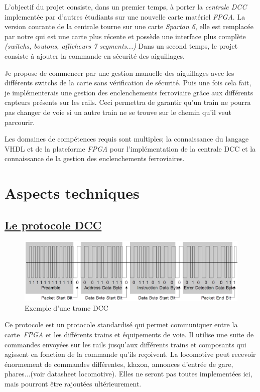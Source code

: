 L'objectif du projet consiste, dans un premier temps, à porter la
\emph{centrale DCC} implement\'ee par d'autres \'etudiants sur une nouvelle
carte mat\'eriel \emph{FPGA}. La version courante de la centrale tourne sur
une carte \emph{Spartan 6}, elle est remplac\'ee par notre \crt qui est
une carte plus r\'ecente et possède une interface plus complète
\emph{(switchs, boutons, afficheurs 7 segments...)}
Dans un second temps, le projet consiste à ajouter la commande en
sécurité des aiguillages.

Je propose de commencer par une gestion manuelle des aiguillages avec
les diff\'erents switchs de la carte sans v\'erification de
s\'ecurit\'e.
Puis une fois cela fait, je impl\'ementerais une gestion des
enclenchements ferroviaire grâce aux différents capteurs pr\'esents sur
les rails. Ceci permettra de garantir qu'un train ne pourra pas
changer de voie si un autre train ne se trouve sur le chemin
qu'il veut parcourir. 

Les domaines de comp\'etences requis sont multiples; la connaissance
du langage VHDL et de la plateforme \emph{FPGA} pour l'impl\'ementation
de la centrale DCC et la connaissance de la gestion des enclenchements
ferroviaires.


\newpage
\section{Aspects techniques}
\label{sec:asp_tech}

\subsection{\underline{Le protocole DCC}}
\label{sec:dcc}


\begin{figure}[h]
\centering
\includegraphics[scale=0.75]{trame.png}
\caption{Exemple d'une trame DCC}
\label{fig1}
\end{figure}

Ce protocole est un protocole standardis\'e qui permet communiquer
entre la carte~\emph{FPGA} et les diff\'erents trains et
équipements de voie.
Il utilise une suite de commandes envoy\'ees sur les rails
jusqu'aux diff\'erents trains et composants qui agissent en fonction de
la commande qu'ils reçoivent.
La locomotive peut recevoir \'enormement de commandes différentes,
klaxon, annonces d'entr\'ee de gare, phares...(voir datasheet
locomotive). Elles ne seront pas toutes implement\'ees ici, mais
pourront \^etre rajout\'ees ult\'erieurement. 


